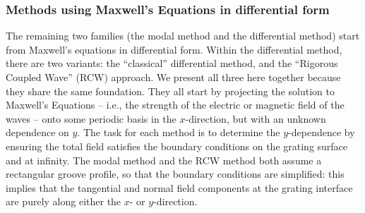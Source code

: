 \subsubsection{Methods using Maxwell's Equations in differential form}
The remaining two families (the modal method and the differential method) start from Maxwell's equations in differential form.  Within the differential method, there are two variants: the ``classical'' differential method, and the ``Rigorous Coupled Wave'' (RCW) approach.  We present all three here together because they share the same foundation.  They all start by projecting the solution to Maxwell's Equations -- i.e., the strength of the electric or magnetic field of the waves -- onto some periodic basis in the $x$-direction, but with an unknown dependence on $y$.  The task for each method is to determine the $y$-dependence by ensuring the total field satisfies the boundary conditions on the grating surface and at infinity.  The modal method and the RCW method both assume a rectangular groove profile, so that the boundary conditions are simplified: this implies that the tangential and normal field components at the grating interface are purely along either the $x$- or $y$-direction.
